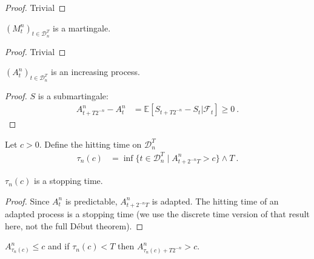 \begin{proof}
  Trivial
\end{proof}


\begin{lemma}\label{lem:Doob_Meyer_Finite_Martingale}
  $(M^n_t)_{t\in\mathcal{D}_n^T}$ is a martingale.
\end{lemma}

\begin{proof}
  Trivial
\end{proof}


\begin{lemma}\label{lem:Predict_Part_Increasing}
  $(A^n_t)_{t\in\mathcal{D}_n^T}$ is an increasing process.
\end{lemma}

\begin{proof}
$S$ is a submartingale:
\begin{align*}
  A^n_{t+T2^{-n}} - A^n_t
  &= \mathbb{E}\left[ S_{t+T2^{-n}}-S_t|\mathcal{F}_t\right] \ge 0
  \: .
\end{align*}
\end{proof}


\begin{definition}\label{def:hittingAGT}
Let $c>0$. Define the hitting time on $\mathcal{D}^T_n$
\begin{align*}
  \tau_n(c)
  &= \inf\{t \in \mathcal{D}^T_n \mid A^n_{t + 2^{-n}T} > c\} \wedge T
  \: .
\end{align*}
\end{definition}


\begin{lemma}\label{lem:IsStoppingTime_hittingAGT}
  $\tau_n(c)$ is a stopping time.
\end{lemma}

\begin{proof}
Since $A^n_{t}$ is predictable, $A^n_{t + 2^{-n}T}$ is adapted.
The hitting time of an adapted process is a stopping time (we use the discrete time version of that result here, not the full Début theorem).
\end{proof}


\begin{lemma}\label{lem:A_hittingAGT_le}
$A^n_{\tau_n(c)} \le c$ and if $\tau_n(c) < T$ then $A^n_{\tau_n(c)+T2^{-n}} > c$.
\end{lemma}

